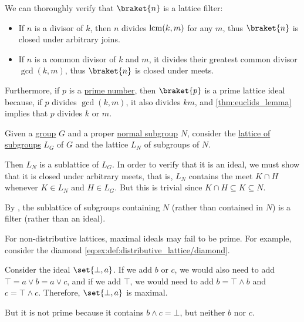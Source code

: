 \begin{example}
\begin{thmenum}
    We can thoroughly verify that \( \braket{ n } \) is a lattice filter:
    \begin{itemize}
      \item If \( n \) is a divisor of \( k \), then \( n \) divides \( \operatorname{lcm}(k, m) \) for any \( m \), thus \( \braket{ n } \) is closed under arbitrary joins.
      \item If \( n \) is a common divisor of \( k \) and \( m \), it divides their greatest common divisor \( \gcd(k, m) \), thus \( \braket{ n } \) is closed under meets.
    \end{itemize}

    Furthermore, if \( p \) is a \hyperref[def:prime_number]{prime number}, then \( \braket{ p } \) is a prime lattice ideal because, if \( p \) divides \( \gcd(k, m) \), it also divides \( km \), and \cref{thm:euclids_lemma} implies that \( p \) divides \( k \) or \( m \).

     Given a \hyperref[def:group]{group} \( G \) and a proper \hyperref[def:normal_subgroup]{normal subgroup} \( N \), consider the \hyperref[thm:substructures_form_complete_lattice]{lattice of subgroups} \( L_G \) of \( G \) and the lattice \( L_N \) of subgroups of \( N \).

    Then \( L_N \) is a sublattice of \( L_G \). In order to verify that it is an ideal, we must show that it is closed under arbitrary meets, that is, \( L_N \) contains the meet \( K \cap H \) whenever \( K \in L_N \) and \( H \in L_G \). But this is trivial since \( K \cap H \subseteq K \subseteq N \).

    By , the sublattice of subgroups containing \( N \) (rather than contained in \( N \)) is a filter (rather than an ideal).

     For non-distributive lattices, maximal ideals may fail to be prime. For example, consider the diamond \eqref{eq:ex:def:distributive_lattice/diamond}.

    Consider the ideal \( \set{ \bot, a } \). If we add \( b \) or \( c \), we would also need to add \( \top = a \vee b = a \vee c \), and if we add \( \top \), we would need to add \( b = \top \wedge b \) and \( c = \top \wedge c \). Therefore, \( \set{ \bot, a } \) is maximal.

    But it is not prime because it contains \( b \wedge c = \bot \), but neither \( b \) nor \( c \).
  \end{thmenum}
\end{example}

